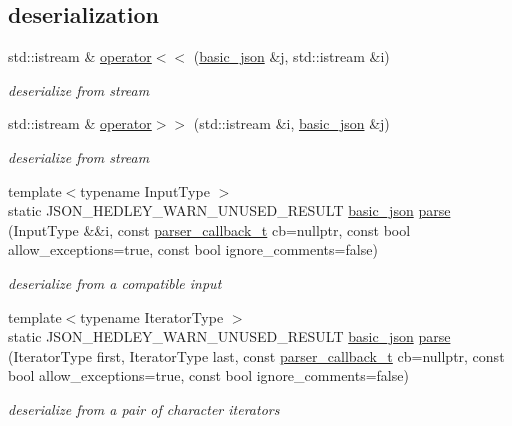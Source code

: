 \subsection*{deserialization}
\begin{DoxyCompactItemize}
\item 
std\+::istream \& \hyperlink{classnlohmann_1_1basic__json_a60ca396028b8d9714c6e10efbf475af6}{operator$<$$<$} (\hyperlink{classnlohmann_1_1basic__json}{basic\+\_\+json} \&j, std\+::istream \&i)
\begin{DoxyCompactList}\small\item\em deserialize from stream \end{DoxyCompactList}\item 
std\+::istream \& \hyperlink{classnlohmann_1_1basic__json_aaf363408931d76472ded14017e59c9e8}{operator$>$$>$} (std\+::istream \&i, \hyperlink{classnlohmann_1_1basic__json}{basic\+\_\+json} \&j)
\begin{DoxyCompactList}\small\item\em deserialize from stream \end{DoxyCompactList}\item 
{\footnotesize template$<$typename Input\+Type $>$ }\\static J\+S\+O\+N\+\_\+\+H\+E\+D\+L\+E\+Y\+\_\+\+W\+A\+R\+N\+\_\+\+U\+N\+U\+S\+E\+D\+\_\+\+R\+E\+S\+U\+LT \hyperlink{classnlohmann_1_1basic__json}{basic\+\_\+json} \hyperlink{classnlohmann_1_1basic__json_a15018ade392a844ea32d5188d1a0b9c6}{parse} (Input\+Type \&\&i, const \hyperlink{classnlohmann_1_1basic__json_a0273d074462644e5d5a7ff313ad0d742}{parser\+\_\+callback\+\_\+t} cb=nullptr, const bool allow\+\_\+exceptions=true, const bool ignore\+\_\+comments=false)
\begin{DoxyCompactList}\small\item\em deserialize from a compatible input \end{DoxyCompactList}\item 
{\footnotesize template$<$typename Iterator\+Type $>$ }\\static J\+S\+O\+N\+\_\+\+H\+E\+D\+L\+E\+Y\+\_\+\+W\+A\+R\+N\+\_\+\+U\+N\+U\+S\+E\+D\+\_\+\+R\+E\+S\+U\+LT \hyperlink{classnlohmann_1_1basic__json}{basic\+\_\+json} \hyperlink{classnlohmann_1_1basic__json_ad832c70af0989389a9a104c21d2d1c5c}{parse} (Iterator\+Type first, Iterator\+Type last, const \hyperlink{classnlohmann_1_1basic__json_a0273d074462644e5d5a7ff313ad0d742}{parser\+\_\+callback\+\_\+t} cb=nullptr, const bool allow\+\_\+exceptions=true, const bool ignore\+\_\+comments=false)
\begin{DoxyCompactList}\small\item\em deserialize from a pair of character iterators \end{DoxyCompactList}\item 

\end{DoxyCompactItemize}
